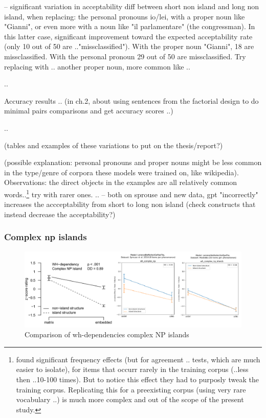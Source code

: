 -- significant variation in acceptability diff between short non island and long non island, when replacing: the personal pronouns io/lei, with a proper noun like "Gianni", or even more with a noun like "il parlamentare" (the congressman). In this latter case, significant improvement toward the expected acceptability rate (only 10 out of 50 are .."missclassified"). With the proper noun "Gianni", 18 are missclassified. With the personal pronoun 29 out of 50 are missclassified.
Try replacing with .. another proper noun, more common like ..

..

Accuracy results .. (in ch.2, about using sentences from the factorial design to do minimal pairs comparisons and get accuracy scores ..)

..

(tables and examples of these variations to put on the thesis/report?)

(possible explanation: personal pronouns and proper nouns might be less common in the type/genre of corpora these models were trained on, like wikipedia).
Observations: the direct objects in the examples are all relatively common words..\footnote{\citet{wei2021frequency} found significant frequency effects (but for agreement .. tests, which are much easier to isolate), for items that occurr rarely in the training corpus (..less then ..10-100 times). But to notice this effect they had to purposly tweak the training corpus. Replicating this for a preexisting corpus (using very rare vocabulary ..) is much more complex and out of the scope of the present study.}
try with rarer ones.
..
-- both on sprouse and new data, gpt "incorrectly" increases the accceptability from short to long non island (check constructs that instead decrease the acceptability?)


\subsubsection{Complex np islands}

\begin{figure}
	\centering
	\includegraphics[width=1\textwidth]{images/Chapter1/combined_wh-complex.png} 
	\caption{Comparison of wh-dependencies complex NP islands} 
	\label{fig:wh_complex} %
\end{figure}

